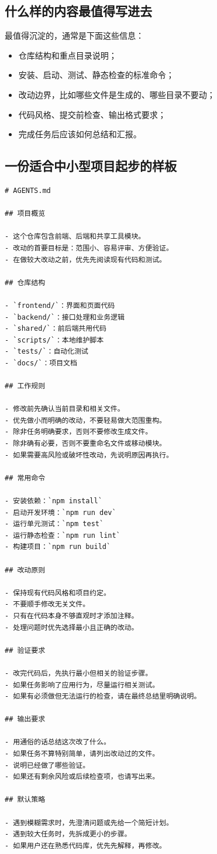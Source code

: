 \documentclass[UTF8,a4paper,12pt]{ctexart}
\begin{document}
\subsection{什么样的内容最值得写进去}

最值得沉淀的，通常是下面这些信息：
\begin{itemize}
  \item 仓库结构和重点目录说明；
  \item 安装、启动、测试、静态检查的标准命令；
  \item 改动边界，比如哪些文件是生成的、哪些目录不要动；
  \item 代码风格、提交前检查、输出格式要求；
  \item 完成任务后应该如何总结和汇报。
\end{itemize}

\subsection{一份适合中小型项目起步的样板}

\begin{lstlisting}[style=cli]
# AGENTS.md

## 项目概览

- 这个仓库包含前端、后端和共享工具模块。
- 改动的首要目标是：范围小、容易评审、方便验证。
- 在做较大改动之前，优先先阅读现有代码和测试。

## 仓库结构

- `frontend/`：界面和页面代码
- `backend/`：接口处理和业务逻辑
- `shared/`：前后端共用代码
- `scripts/`：本地维护脚本
- `tests/`：自动化测试
- `docs/`：项目文档

## 工作规则

- 修改前先确认当前目录和相关文件。
- 优先做小而明确的改动，不要轻易做大范围重构。
- 除非任务明确要求，否则不要修改生成文件。
- 除非确有必要，否则不要重命名文件或移动模块。
- 如果需要高风险或破坏性改动，先说明原因再执行。

## 常用命令

- 安装依赖：`npm install`
- 启动开发环境：`npm run dev`
- 运行单元测试：`npm test`
- 运行静态检查：`npm run lint`
- 构建项目：`npm run build`

## 改动原则

- 保持现有代码风格和项目约定。
- 不要顺手修改无关文件。
- 只有在代码本身不够直观时才添加注释。
- 处理问题时优先选择最小且正确的改动。

## 验证要求

- 改完代码后，先执行最小但相关的验证步骤。
- 如果任务影响了应用行为，尽量运行相关测试。
- 如果有必须做但无法运行的检查，请在最终总结里明确说明。

## 输出要求

- 用通俗的话总结这次改了什么。
- 如果任务不算特别简单，请列出改动过的文件。
- 说明已经做了哪些验证。
- 如果还有剩余风险或后续检查项，也请写出来。

## 默认策略

- 遇到模糊需求时，先澄清问题或先给一个简短计划。
- 遇到较大任务时，先拆成更小的步骤。
- 如果用户还在熟悉代码库，优先先解释，再修改。
\end{lstlisting}
\end{document}
